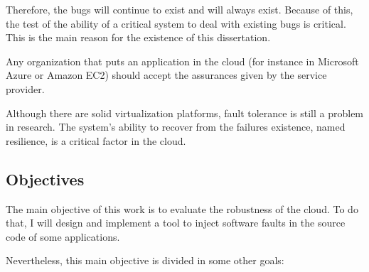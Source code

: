 Therefore, the bugs will continue to exist and will always exist. Because of this, the test of the ability of a critical system to deal with existing bugs is critical. This is the main reason for the existence of this dissertation.

Any organization that puts an application in the cloud (for instance in Microsoft Azure or Amazon EC2) should accept the assurances given by the service provider.



Although there are solid virtualization platforms, fault tolerance is still a problem in research. The system's ability to recover from the failures existence, named resilience, is a critical factor in the cloud.





\subsection{Objectives}

The main objective of this work is to evaluate the robustness of the cloud. To do that, I will design and implement a tool to inject software faults in the source code of some applications.

Nevertheless, this main objective is divided in some other goals:


